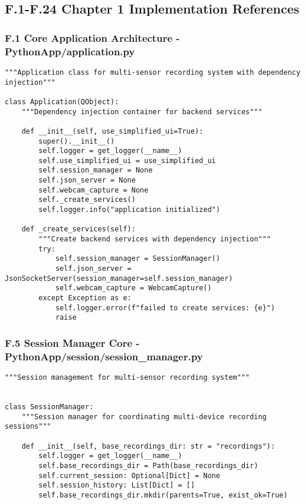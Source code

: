 \documentclass[11pt,a4paper]{report}
\begin{document}
{{\subsection{F.1-F.24 Chapter 1 Implementation References}

\subsubsection{F.1 Core Application Architecture - PythonApp/application.py}

\begin{verbatim}
"""Application class for multi-sensor recording system with dependency injection"""

class Application(QObject):
    """Dependency injection container for backend services"""

    def __init__(self, use_simplified_ui=True):
        super().__init__()
        self.logger = get_logger(__name__)
        self.use_simplified_ui = use_simplified_ui
        self.session_manager = None
        self.json_server = None
        self.webcam_capture = None
        self._create_services()
        self.logger.info("application initialized")

    def _create_services(self):
        """Create backend services with dependency injection"""
        try:
            self.session_manager = SessionManager()
            self.json_server = JsonSocketServer(session_manager=self.session_manager)
            self.webcam_capture = WebcamCapture()
        except Exception as e:
            self.logger.error(f"failed to create services: {e}")
            raise
\end{verbatim}

\subsubsection{F.5 Session Manager Core - PythonApp/session/session_manager.py}

\begin{verbatim}
"""Session management for multi-sensor recording system"""


class SessionManager:
    """Session manager for coordinating multi-device recording sessions"""

    def __init__(self, base_recordings_dir: str = "recordings"):
        self.logger = get_logger(__name__)
        self.base_recordings_dir = Path(base_recordings_dir)
        self.current_session: Optional[Dict] = None
        self.session_history: List[Dict] = []
        self.base_recordings_dir.mkdir(parents=True, exist_ok=True)


\end{verbatim}}}
\end{document}
